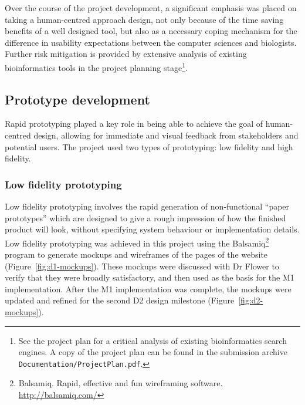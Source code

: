 Over the course of the project development, a significant emphasis was
placed on taking a human-centred approach design, not only because of
the time saving benefits of a well designed tool, but also as a
necessary coping mechanism for the difference in usability
expectations between the computer sciences and biologists. Further
risk mitigation is provided by extensive analysis of existing
bioinformatics tools in the project planning stage\footnote{See the
  project plan for a critical analysis of existing bioinformatics
  search engines. A copy of the project plan can be found in the
  submission archive \texttt{Documentation/ProjectPlan.pdf}.}.

\subsection{Prototype development}\label{subsec:prototype-development}

Rapid prototyping played a key role in being able to achieve the goal
of human-centred design, allowing for immediate and visual feedback
from stakeholders and potential users. The project used two types of
prototyping: low fidelity and high fidelity.

\subsubsection*{Low fidelity prototyping}

Low fidelity prototyping involves the rapid generation of
non-functional ``paper prototypes'' which are designed to give a rough
impression of how the finished product will look, without specifying
system behaviour or implementation details. Low fidelity prototyping
was achieved in this project using the
Balsamiq\footnote{Balsamiq. Rapid, effective and fun wireframing
  software. \url{http://balsamiq.com/}} program to generate mockups
and wireframes of the pages of the website
(Figure~\ref{fig:d1-mockups}). These mockups were discussed with Dr
Flower to verify that they were broadly satisfactory, and then used as
the basis for the M1 implementation. After the M1 implementation was
complete, the mockups were updated and refined for the second D2
design milestone (Figure~\ref{fig:d2-mockups}).


